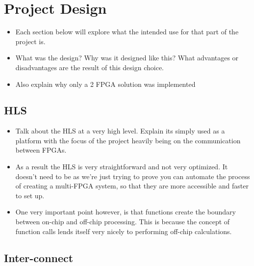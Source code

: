 \chapter{Project Design}

\begin{itemize}
    \item Each section below will explore what the intended use for that part of the project is.
    \item What was the design? Why was it designed like this? What advantages or disadvantages are the result of this design choice.
    \item Also explain why only a 2 FPGA solution was implemented
\end{itemize}

\section{HLS}

\begin{itemize}
    \item Talk about the HLS at a very high level. Explain its simply used as a platform with the focus of the project heavily being on the communication between FPGAs.
    \item As a result the HLS is very straightforward and not very optimized. It doesn't need to be as we're just trying to prove you can automate the process of creating a multi-FPGA system, so that they are more accessible and faster to set up.
    \item One very important point however, is that functions create the boundary between on-chip and off-chip processing. This is because the concept of function calls lends itself very nicely to performing off-chip calculations.
\end{itemize}

\section{Inter-connect}

